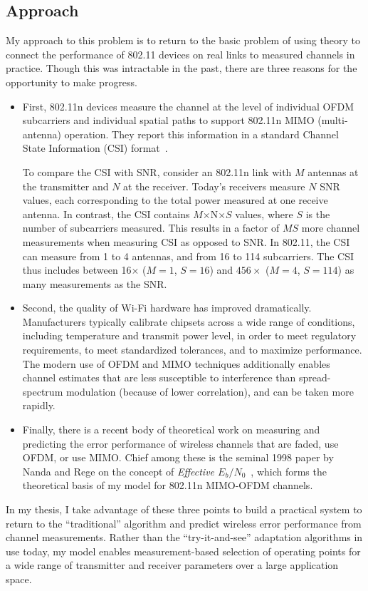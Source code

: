 \subsection{Approach}
My approach to this problem is to return to the basic problem of using theory to connect the performance of 802.11 devices on real links to measured channels in practice. Though this was intractable in the past, there are three reasons for the opportunity to make progress.
\begin{itemize}
\item First, 802.11n devices measure the channel at the level of individual OFDM subcarriers and individual spatial paths to support 802.11n MIMO (multi-antenna) operation. They report this information in a standard Channel State Information (CSI) format~\cite[\S7.3.1.27]{80211n}.

To compare the CSI with SNR, consider an 802.11n link with $M$ antennas at the transmitter and $N$ at the receiver. Today's receivers measure $N$ SNR values, each corresponding to the total power measured at one receive antenna. In contrast, the CSI contains $M$$\times$N$\times$$S$ values, where $S$ is the number of subcarriers measured. This results in a factor of $MS$ more channel measurements when measuring CSI as opposed to SNR\@. In 802.11, the CSI can measure from 1 to 4 antennas, and from 16 to 114 subcarriers. The CSI thus includes between 16$\times$ ($M=1$, $S=16$) and $456\times$ ($M=4$, $S=114$) as many measurements as the SNR\@.
\item Second, the quality of Wi-Fi hardware has improved dramatically. Manufacturers typically calibrate chipsets across a wide range of conditions, including temperature and transmit power level, in order to meet regulatory requirements, to meet standardized tolerances, and to maximize performance. The modern use of OFDM and MIMO techniques additionally enables channel estimates that are less susceptible to interference than spread-spectrum modulation (because of lower correlation), and can be taken more rapidly.
\item Finally, there is a recent body of theoretical work on measuring and predicting the error performance of wireless channels that are faded, use OFDM, or use MIMO\@. Chief among these is the seminal 1998 paper by Nanda and Rege on the concept of \emph{Effective $E_b/N_0$}~\cite{Nanda_effectiveSNR}, which forms the theoretical basis of my model for 802.11n MIMO-OFDM channels.
\end{itemize}
In my thesis, I take advantage of these three points to build a practical system to return to the ``traditional'' algorithm and predict wireless error performance from channel measurements. Rather than the ``try-it-and-see'' adaptation algorithms in use today, my model enables measurement-based selection of operating points for a wide range of transmitter and receiver parameters over a large application space.

